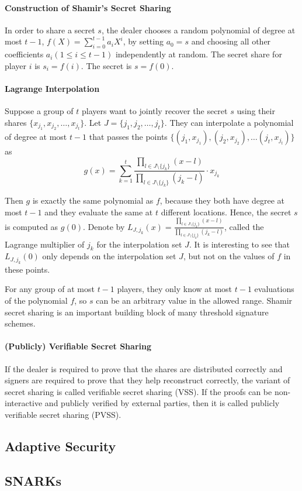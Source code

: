 \paragraph{Construction of Shamir's Secret Sharing} In order to share a secret $s$, the dealer chooses a random polynomial of degree at most $t-1$, $f(X)=\sum_{i=0}^{t-1} a_i X^i$, by setting $a_0=s$ and choosing all other coefficients $a_i(1\le i\le t-1)$ independently at random. The secret share for player $i$ is $s_i = f(i)$. The secret is $s=f(0)$. 

\paragraph{Lagrange Interpolation} Suppose a group of $t$ players want to jointly recover the secret $s$ using their shares $\{x_{j_1}, x_{j_2},\dots, x_{j_t}\}$. Let $J = \{j_1, j_2, \dots, j_t\}$. They can interpolate a polynomial of degree at most $t-1$ that passes the points $\{(j_1, x_{j_1}), (j_2, x_{j_2}), \dots (j_t, x_{j_t})\}$ as
\begin{equation*} 
    g(x) = \sum_{k=1}^{t}\frac{\prod_{l \in J\setminus \{j_k\} } (x - l)}{\prod_{l \in J\setminus \{j_k\} } (j_k - l)}\cdot x_{j_k}   
\end{equation*}

\par Then $g$ is exactly the same polynomial as $f$, because they both have degree at most $t-1$ and they evaluate the same at $t$ different locations. Hence, the secret $s$ is computed as $g(0)$. Denote by $L_{J, j_k}(x) = \frac{\prod_{l \in J\setminus \{j_k\} } (x - l)}{\prod_{l \in J\setminus \{j_k\} } (j_k - l)}$, called the Lagrange multiplier of $j_k$ for the interpolation set $J$. It is interesting to see that $L_{J, j_k}(0)$ only depends on the interpolation set $J$, but not on the values of $f$ in these points.  

For any group of at most $t-1$ players, they only know at most $t-1$ evaluations of the polynomial $f$, so $s$ can be an arbitrary value in the allowed range. Shamir secret sharing is an important building block of many threshold signature schemes. 

\paragraph{(Publicly) Verifiable Secret Sharing} If the dealer is required to prove that the shares are distributed correctly and signers are required to prove that they help reconstruct correctly, the variant of secret sharing is called verifiable secret sharing (VSS). If the proofs can be non-interactive and publicly verified by external parties, then it is called publicly verifiable secret sharing (PVSS). 

\subsection{Adaptive Security}

\subsection{SNARKs}